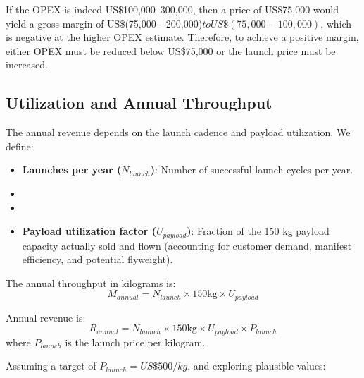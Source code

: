 If the OPEX is indeed US\$100,000–300,000, then a price of US\$75,000 would yield a gross margin of US\$(75{,}000 - 200{,}000)$ to US\$(75{,}000 - 100{,}000)$, which is negative at the higher OPEX estimate. Therefore, to achieve a positive margin, either OPEX must be reduced below US\$75,000 or the launch price must be increased.

\subsection{Utilization and Annual Throughput}
The annual revenue depends on the launch cadence and payload utilization. We define:
\begin{itemize}
    \item \textbf{Launches per year ($N_{launch}$)}: Number of successful launch cycles per year.
    \item \item \item \textbf{Payload utilization factor ($U_{payload}$)}: Fraction of the 150 kg payload capacity actually sold and flown (accounting for customer demand, manifest efficiency, and potential flyweight).
\end{itemize}

The annual throughput in kilograms is:
\begin{equation}
M_{annual} = N_{launch} \times 150  \text{kg} \times U_{payload}
\end{equation}

Annual revenue is:
\begin{equation}
R_{annual} = N_{launch} \times 150  \text{kg} \times U_{payload} \times P_{launch}
\end{equation}
where $P_{launch}$ is the launch price per kilogram.

Assuming a target of $P_{launch} = US\$500/kg$, and exploring plausible values:

